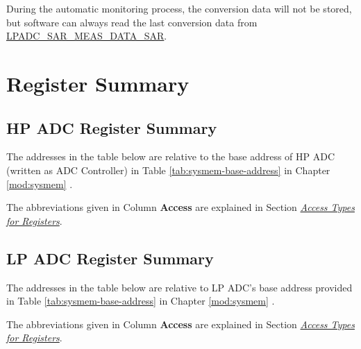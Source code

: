 \documentclass[main\_\_EN.tex]{subfiles}
\begin{document}
During the automatic monitoring process, the conversion data will not be stored, but software can always read the last conversion data from \hyperref[fielddesc:LPADCMEAS1DATASAR]{LPADC\_SAR\_MEAS\_DATA\_SAR}.





\newpage
\hypertarget{adc-reg-summ}{}
\section{Register Summary}
\label{sec:adc-reg-summ}
\subsection{HP ADC Register Summary}
The addresses in the table below are relative to the base address of HP ADC (written as ADC Controller) in Table \ref{tab:sysmem-base-address} in Chapter \ref{mod:sysmem} \textit{}.

The abbreviations given in Column \textbf{Access} are explained in Section \hyperref[glossary-access-types]{\textit{Access Types for Registers}}.



\subsection{LP ADC Register Summary}

The addresses in the table below are relative to LP ADC's base address provided in Table \ref{tab:sysmem-base-address} in Chapter \ref{mod:sysmem} \textit{}.

The abbreviations given in Column \textbf{Access} are explained in Section \hyperref[glossary-access-types]{\textit{Access Types for Registers}}.





\end{document}
